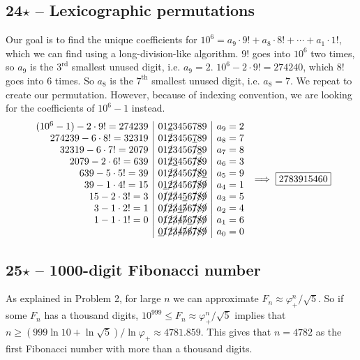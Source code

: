 \documentclass{article}
\begin{document}
\subsection*{24$\star$ -- Lexicographic permutations} 
Our goal is to find the unique coefficients for $10^6 = a_9\cdot9! + a_8\cdot8! + \cdots + a_1\cdot1!$, which we can find using a long-division-like algorithm. 
$9!$ goes into $10^6$ two times, so $a_9$ is the $3^\text{rd}$ smallest unused digit, i.e. $a_9 = 2$. 
$10^6 - 2 \cdot 9! = 274240$, which $8!$ goes into 6 times.
So $a_8$ is the $7^\text{th}$ smallest unused digit, i.e. $a_8 = 7$. 
We repeat to create our permutation. 
However, because of indexing convention, we are looking for the coefficients of $10^6 - 1$ instead.
\begin{align*} 
	\begin{array}{r | l | l}
	(10^6 - 1) - 2 \cdot 9! = 274239 & 01\underline{2}3456789 & a_9 = 2\\
	274239 - 6 \cdot 8! = 32319 & 01\slashed{2}3456\underline{7}89 & a_8 = 7 \\
	32319 - 6 \cdot 7! = 2079 & 01\slashed{2}3456\slashed{7}\underline{8}9 & a_7 = 8 \\
	2079 - 2 \cdot 6! = 639 & 01\slashed{2}\underline{3}456\slashed{7}\slashed{8}9 & a_6 = 3 \\
	639 - 5 \cdot 5! = 39 & 01\slashed{2}\slashed{3}456\slashed{7}\slashed{8}\underline{9} & a_5 = 9 \\
	39 - 1 \cdot 4! =  15 & 0\underline{1}\slashed{2}\slashed{3}456\slashed{7}\slashed{8}\slashed{9} & a_4 = 1 \\
	15 - 2 \cdot 3! = 3 & 0\slashed{1}\slashed{2}\slashed{3}4\underline{5}6\slashed{7}\slashed{8}\slashed{9} & a_3 = 5 \\
	3 - 1 \cdot 2! = 1 & 0\slashed{1}\slashed{2}\slashed{3}\underline{4}\slashed{5}6\slashed{7}\slashed{8}\slashed{9} & a_2 = 4 \\
	1 - 1 \cdot 1! = 0 & 0\slashed{1}\slashed{2}\slashed{3}\slashed{4}\slashed{5}\underline{6}\slashed{7}\slashed{8}\slashed{9} & a_1 = 6 \\
	& \underline{0}\slashed{1}\slashed{2}\slashed{3}\slashed{4}\slashed{5}\slashed{6}\slashed{7}\slashed{8}\slashed{9} & a_0 = 0
	\end{array} \implies \boxed{ 2783915460} 
\end{align*}

\subsection*{25$\star$ -- 1000-digit Fibonacci number} 
As explained in Problem 2, for large $n$ we can approximate $F_n \approx \varphi_+^n / \sqrt{5}$. 
So if some $F_n$ has a thousand digits, $10^{999} \leq F_n \approx \varphi_+^n / \sqrt{5}$ implies that $n \geq (999 \ln 10 + \ln \sqrt{5})/ \ln \varphi_+ \approx 4781.859$. 
This gives that $n = \boxed{4782}$ as the first Fibonacci number with more than a thousand digits.
\end{document}
